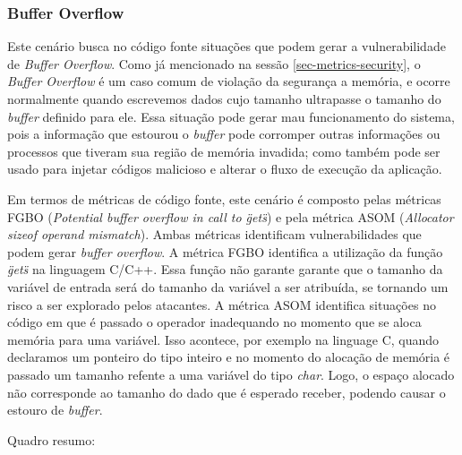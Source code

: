 \subsubsection{Buffer Overflow}

Este cenário busca no código fonte situações que podem gerar a vulnerabilidade de \emph{Buffer Overflow}. Como já mencionado na sessão \ref{sec-metrics-security}, o \emph{Buffer Overflow} é um caso comum de violação da segurança a memória, e ocorre normalmente quando escrevemos dados cujo tamanho  ultrapasse o tamanho do \emph{buffer} definido para ele. Essa situação pode gerar  mau funcionamento do sistema, pois a informação que estourou o \emph{buffer} pode corromper outras informações ou processos que tiveram sua região de memória invadida; como também pode ser usado para injetar códigos malicioso e alterar o fluxo de execução da aplicação.

Em termos de métricas de código fonte, este cenário é composto pelas métricas FGBO (\emph{Potential buffer overflow in call to \"gets\"}) e pela métrica ASOM (\emph{Allocator sizeof operand mismatch}). Ambas métricas identificam vulnerabilidades que podem gerar \emph{buffer overflow}. A métrica FGBO identifica a utilização da função \emph{\"gets\"} na linguagem C/C++. Essa função não garante garante que o tamanho da variável de entrada será do tamanho da variável a ser atribuída, se tornando um risco a ser explorado pelos atacantes. A métrica ASOM identifica situações no código em que é passado o operador inadequando no momento que se aloca memória para uma variável. Isso acontece, por exemplo na linguage C, quando declaramos um ponteiro do tipo inteiro e no momento do alocação de memória é passado um tamanho refente a uma variável do tipo \emph{char}. Logo, o espaço alocado não corresponde ao tamanho do dado que é esperado receber, podendo causar o estouro de \emph{buffer}.

Quadro resumo:

